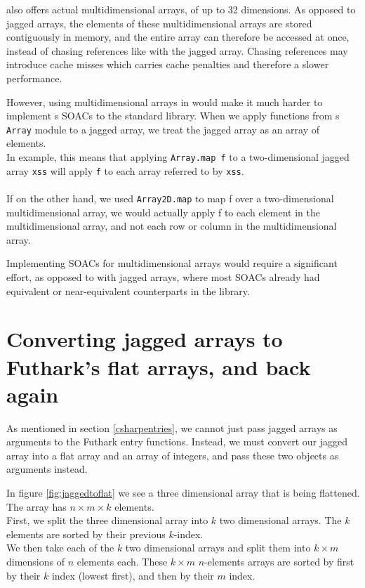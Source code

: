 \fsharp{} also offers actual multidimensional arrays, of up to 32 dimensions.
As opposed to jagged arrays, the elements of these multidimensional arrays are
stored contiguously in memory, and the entire array can therefore be accessed at
once, instead of chasing references like with the jagged array. Chasing
references may introduce cache misses which carries cache penalties and
therefore a slower performance.

However, using multidimensional arrays in \fshark{} would make it much harder to
implement \fshark{}s SOACs to the standard library. 
When we apply functions from \fsharp{}s \texttt{Array} module to a jagged
array, we treat the jagged array as an array of elements.\\
In example, this means that applying \texttt{Array.map f} to a two-dimensional
jagged array \texttt{xss} will apply \texttt{f} to each array referred to by
\texttt{xss}.\\\\
If on the other hand, we used \texttt{Array2D.map} to map f over a
two-dimensional multidimensional array, we would actually apply f to each
element in the multidimensional array, and not each row or column in the
multidimensional array.

Implementing SOACs for multidimensional arrays would require a significant
effort, as opposed to with jagged arrays, where most SOACs already had
equivalent or near-equivalent counterparts in the \fsharp{} library.

\section{Converting jagged arrays to Futhark's flat arrays,  and back again}
As mentioned in section \ref{csharpentries}, we cannot just pass jagged arrays
as arguments to the Futhark \csharp{} entry functions.
Instead, we must convert our jagged array into a flat array and an array of
integers, and pass these two objects as arguments instead.

In figure \ref{fig:jaggedtoflat} we see a three dimensional array that is being
flattened. The array has $n \times m \times k$ elements.
\\
First, we split the three dimensional array into $k$ two dimensional arrays. The
$k$ elements are sorted by their previous $k$-index.
\\
We then take each of the $k$ two dimensional arrays and split them into $k
\times m$ dimensions of $n$ elements each.
These $k \times m$ $n$-elements arrays are sorted by first by their $k$ index
(lowest first), and then by their $m$ index.

